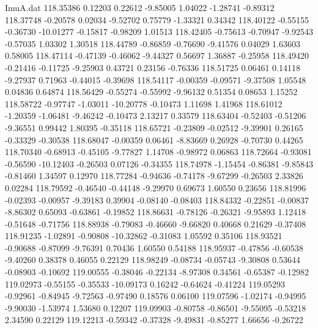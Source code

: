 \begin{filecontents}{ImuA.dat}
 118.35386    0.12203    0.22612   -9.85005    1.04022   -1.28741   -0.89312
 118.37748   -0.20578    0.02034   -9.52702    0.75779   -1.33321    0.34342
 118.40122   -0.55155   -0.36730  -10.01277   -0.15817   -0.98209    1.01513
 118.42405   -0.75613   -0.70947   -9.92543   -0.57035    1.03302    1.30518
 118.44789   -0.86859   -0.76690   -9.41576    0.04029    1.63603    0.58005
 118.47114   -0.47139   -0.46062   -9.44327    0.56697    1.36887   -0.25958
 118.49420   -0.21416   -0.11725   -9.25903    0.43721    0.23156   -0.76336
 118.51725    0.06461    0.14118   -9.27937    0.71963   -0.44015   -0.39698
 118.54117   -0.00359   -0.09571   -9.37508    1.05548    0.04836    0.64874
 118.56429   -0.55274   -0.55992   -9.96132    0.51354    0.08653    1.15252
 118.58722   -0.97747   -1.03011  -10.20778   -0.10473    1.11698    1.41968
 118.61012   -1.20359   -1.06481   -9.46242   -0.10473    2.13217    0.33579
 118.63404   -0.52403   -0.51206   -9.36551    0.99442    1.80395   -0.35118
 118.65721   -0.23809   -0.02512   -9.39901    0.26165   -0.33329   -0.30538
 118.68047   -0.00359    0.06461   -8.83669    0.26928   -0.70730    0.44265
 118.70340   -0.68913   -0.45105   -9.77827    1.14708   -0.98972    0.06863
 118.72664   -0.93081   -0.56590  -10.12403   -0.26503    0.07126   -0.34355
 118.74978   -1.15454   -0.86381   -9.85843   -0.81460    1.34597    0.12970
 118.77284   -0.94636   -0.74178   -9.67299   -0.26503    2.33826    0.02284
 118.79592   -0.46540   -0.44148   -9.29970    0.69673    1.60550    0.23656
 118.81996   -0.02393   -0.00957   -9.39183    0.39904   -0.08140   -0.08403
 118.84332   -0.22851   -0.00837   -8.86302    0.65093   -0.63861   -0.19852
 118.86631   -0.78126   -0.26321   -9.95893    1.12418   -0.51648   -0.71756
 118.88938   -0.79083   -0.46660   -9.66820    0.40668    0.21629   -0.37408
 118.91235   -1.02891   -0.90808  -10.32862   -0.31083    1.05592    0.35106
 118.93521   -0.90688   -0.87099   -9.76391    0.70436    1.60550    0.54188
 118.95937   -0.47856   -0.60538   -9.40260    0.38378    0.46055    0.22129
 118.98249   -0.08734   -0.05743   -9.30808    0.53644   -0.08903   -0.10692
 119.00555   -0.38046   -0.22134   -8.97308    0.34561   -0.65387   -0.12982
 119.02973   -0.55155   -0.35533  -10.09173    0.16242   -0.64624   -0.41224
 119.05293   -0.92961   -0.84945   -9.72563   -0.97490    0.18576    0.06100
 119.07596   -1.02174   -0.94995   -9.90030   -1.53974    1.53680    0.12207
 119.09903   -0.80758   -0.86501   -9.55095   -0.53218    2.34590    0.22129
 119.12213   -0.59342   -0.37328   -9.49831   -0.85277    1.66656   -0.26722

\end{filecontents}
